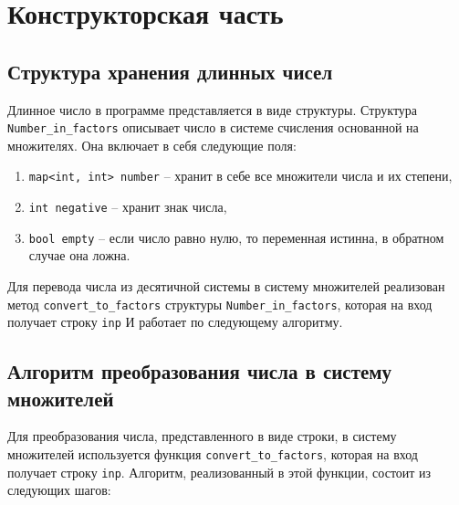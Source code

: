 \chapter{Конструкторская часть}

\section{Структура хранения длинных чисел} 
Длинное число в программе представляется в виде структуры. Структура \texttt{Number\_in\_fa\-ctors} описывает число в системе счисления основанной на множителях. Она включает в себя следующие поля:

\begin{enumerate}
	\item \texttt{map<int, int> number} -- хранит в себе все множители числа и их степени,
	\item \texttt{int negative} -- хранит знак числа,
	\item \texttt{bool empty} -- если число равно нулю, то переменная истинна, в обратном случае она ложна. 
\end{enumerate}

Для перевода числа из десятичной системы в систему множителей реализован метод \texttt{convert\_to\_factors} структуры \texttt{Number\_in\_factors}, которая на вход получает строку \texttt{inp} И работает по следующему алгоритму.

\section{Алгоритм преобразования числа в систему множителей}
Для преобразования числа, представленного в виде строки, в систему множителей используется функция \texttt{convert\_to\_factors}, которая на вход получает строку \texttt{inp}. Алгоритм, реализованный в этой функции, состоит из следующих шагов:

